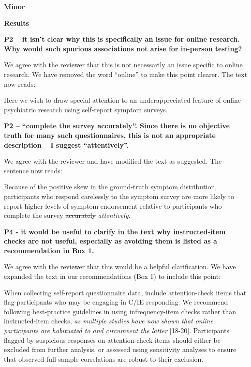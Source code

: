 \documentclass[a4paper,notitlepage,12pt]{article}
\begin{document}
\textbf{Minor}

\textbf{Results}

\textbf{P2 – it isn't clear why this is specifically an issue for online research. Why would such spurious associations not arise for in-person testing?}

We agree with the reviewer that this is not necessarily an issue specific to online research. We have removed the word ``online'' to make this point clearer. The text now reads:

\begin{displayquote}
Here we wish to draw special attention to an underappreciated feature of \st{online} psychiatric research using self-report symptom surveys.
\end{displayquote}

\textbf{P2 – ``complete the survey accurately''. Since there is no objective truth for many such questionnaires, this is not an appropriate description – I suggest ``attentively''.}

We agree with the reviewer and have modified the text as suggested. The sentence now reads:

\begin{displayquote}
Because of the positive skew in the ground-truth symptom distribution, participants who respond carelessly to the symptom survey are more likely to report higher levels of symptom endorsement relative to participants who complete the survey \st{accurately} \textit{attentively}.
\end{displayquote}

\textbf{P4 - it would be useful to clarify in the text why instructed-item checks are not useful, especially as avoiding them is listed as a recommendation in Box 1.}

We agree with the reviewer that this would be a helpful clarification. We have expanded the text in our recommendations (Box 1) to include this point:

\begin{displayquote}
When collecting self-report questionnaire data, include attention-check items that flag participants who may be engaging in C/IE responding. We recommend following best-practice guidelines in using infrequency-item checks rather than instructed-item checks, \textit{as multiple studies have now shown that online participants are habituated to and circumvent the latter} [18-20]. Participants flagged by suspicious responses on attention-check items should either be excluded from further analysis, or assessed using sensitivity analyses to ensure that observed full-sample correlations are robust to their exclusion.
\end{displayquote}
\end{document}
